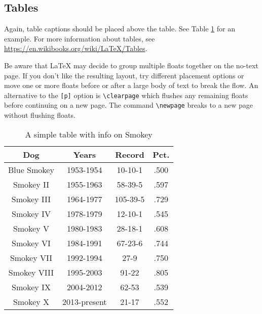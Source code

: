 \subsection{Tables}

Again, table captions should be placed above the table. See Table \ref{tab:table-a} for an example. 
For more information about tables, 
see \href{https://en.wikibooks.org/wiki/LaTeX/Tables}{https://en.wikibooks.org/wiki/LaTeX/Tables}.

Be aware that LaTeX may decide to group multiple floats together on the no-text page. 
If you don't like the resulting layout, try different placement options or move
one or more floats before or after a large body of text to break the flow. 
An alternative to the \verb+[p]+ option is 
\verb+\clearpage+ which flushes any remaining floats before continuing on a new page. 
The command \verb+\newpage+ breaks to a new page without flushing floats. 

\begin{table}[p]
\caption{A simple table with info on Smokey}
\label{tab:table-a}
\begin{center}
\begin{tabular}[b]{|c|c|c|c|}
	\hline
	Dog & Years & Record & Pct. \\ \hline
	Blue Smokey & 1953-1954 & 10-10-1 & .500 \\ \hline
	Smokey II & 1955-1963 & 58-39-5 & .597 \\ \hline
	Smokey III & 1964-1977 & 105-39-5 & .729 \\ \hline
	Smokey IV & 1978-1979 & 12-10-1 & .545 \\ \hline
	Smokey V & 1980-1983 & 28-18-1 & .608 \\ \hline
	Smokey VI & 1984-1991 & 67-23-6 & .744 \\ \hline
	Smokey VII & 1992-1994 & 27-9 & .750 \\ \hline
	Smokey VIII & 1995-2003 & 91-22 & .805 \\ \hline
	Smokey IX & 2004-2012 & 62-53 & .539 \\ \hline
	Smokey X & 2013-present & 21-17 & .552 \\ \hline
\end{tabular}
\end{center}
\end{table}


